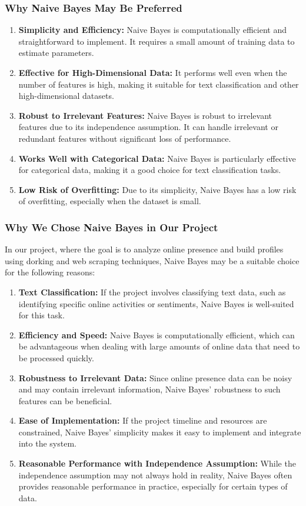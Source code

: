 \documentclass[openany]{report}
\begin{document}
\subsubsection{Why Naive Bayes May Be Preferred}
\begin{enumerate}
    \item \textbf{Simplicity and Efficiency:} Naive Bayes is computationally efficient and straightforward to implement. It requires a small amount of training data to estimate parameters.
    \item \textbf{Effective for High-Dimensional Data:} It performs well even when the number of features is high, making it suitable for text classification and other high-dimensional datasets.
    \item \textbf{Robust to Irrelevant Features:} Naive Bayes is robust to irrelevant features due to its independence assumption. It can handle irrelevant or redundant features without significant loss of performance.
    \item \textbf{Works Well with Categorical Data:} Naive Bayes is particularly effective for categorical data, making it a good choice for text classification tasks.
    \item \textbf{Low Risk of Overfitting:} Due to its simplicity, Naive Bayes has a low risk of overfitting, especially when the dataset is small.
\end{enumerate}

\subsubsection{Why We Chose Naive Bayes in Our Project}
In our project, where the goal is to analyze online presence and build profiles using dorking and web scraping techniques, Naive Bayes may be a suitable choice for the following reasons:
\begin{enumerate}
    \item \textbf{Text Classification:} If the project involves classifying text data, such as identifying specific online activities or sentiments, Naive Bayes is well-suited for this task.
    \item \textbf{Efficiency and Speed:} Naive Bayes is computationally efficient, which can be advantageous when dealing with large amounts of online data that need to be processed quickly.
    \item \textbf{Robustness to Irrelevant Data:} Since online presence data can be noisy and may contain irrelevant information, Naive Bayes' robustness to such features can be beneficial.
    \item \textbf{Ease of Implementation:} If the project timeline and resources are constrained, Naive Bayes' simplicity makes it easy to implement and integrate into the system.
    \item \textbf{Reasonable Performance with Independence Assumption:} While the independence assumption may not always hold in reality, Naive Bayes often provides reasonable performance in practice, especially for certain types of data.
\end{enumerate}
\end{document}

